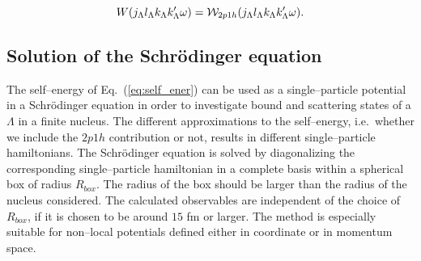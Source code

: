 \begin{equation}
    W(j_{\Lambda}l_{\Lambda}k_{\Lambda}k_{\Lambda}'\omega)=
       {\cal W}_{2p1h}(j_{\Lambda}l_{\Lambda}k_{\Lambda}k_{\Lambda}'\omega).
       \label{eq:imV}
\end{equation}

\subsection{Solution of the Schr\"odinger equation}



The self--energy of Eq.\ (\ref{eq:self_ener})
can be
used as a single--particle potential  in a
Schr\"o\-din\-ger equation in order to investigate
bound and scattering states of a  $\Lambda$
in a finite nucleus.
The different approximations to the
self--energy, i.e.\ whether we include the $2p1h$
contribution
or not, results in different single--particle hamiltonians.
The Schr\"o\-din\-ger equation is solved by diagonalizing the corresponding
single--particle hamiltonian in a complete basis within a spherical box
of radius $R_{box}$. The radius of the box should be larger than the radius
of the nucleus considered. The calculated observables are independent of the
choice of $R_{box}$, if it is chosen to be around $15$ fm or larger. 
The method is especially suitable for non--local 
potentials defined either in coordinate or in momentum space.

